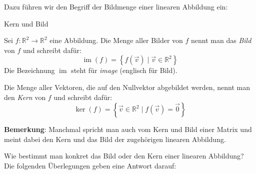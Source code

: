 Dazu führen wir den Begriff der Bildmenge einer linearen Abbildung ein:
\begin{definition}
    {Kern und Bild}{}
   

Sei \( f \colon \mathbb{R}^2 \to \mathbb{R}^2 \) eine Abbildung.  
Die Menge aller Bilder von \( f \) nennt man das \emph{Bild} von \( f \) und schreibt dafür:
\[
\operatorname{im}(f) = \left\{ f(\vec{v}) \mid \vec{v} \in \mathbb{R}^2 \right\}
\]
Die Bezeichnung \( \operatorname{im} \) steht für \emph{image} (englisch für Bild).

\medskip

Die Menge aller Vektoren, die auf den Nullvektor abgebildet werden, nennt man den \emph{Kern} von \( f \) und schreibt dafür:
\[
\ker(f) = \left\{ \vec{v} \in \mathbb{R}^2 \mid f(\vec{v}) = \vec{0} \right\}
\]

\end{definition}
\textbf{Bemerkung}: Manchmal spricht man auch vom Kern und Bild einer Matrix und meint dabei den Kern und das Bild der zugehörigen linearen Abbildung.

Wie bestimmt man konkret das Bild oder den Kern einer linearen Abbildung? Die folgenden Überlegungen geben eine Antwort darauf:



